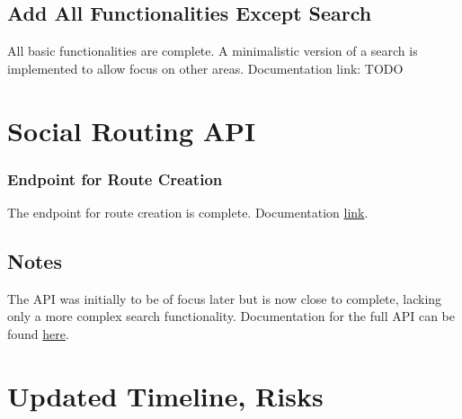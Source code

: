 \documentclass{article}
\begin{document}
        \subsection*{Add All Functionalities Except Search}
        All basic functionalities are complete. A minimalistic version of a search is implemented to allow focus on other areas.
        Documentation link: TODO
    \newpage
    \section{Social Routing API}    
        \subsubsection*{Endpoint for Route Creation}
        The endpoint for route creation is complete.
        Documentation \href{https://github.com/baltasarb/social-routing/wiki/Social-Routing-API#create-route}{link}.
        \subsection*{Notes}
        The API was initially to be of focus later but is now close to complete, lacking only a more complex search functionality.
        Documentation for the full API can be found \href{https://github.com/baltasarb/social-routing/wiki/Social-Routing-API}{here}. 
        
    \section{Updated Timeline, Risks}

   
\end{document}
